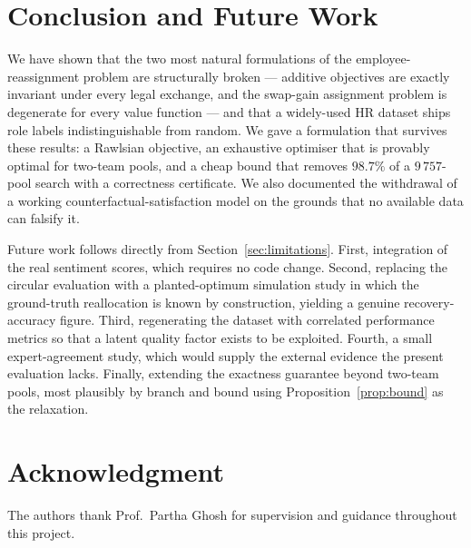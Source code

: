 \documentclass[conference]{IEEEtran}
\begin{document}
\section{Conclusion and Future Work}\label{sec:conclusion}

We have shown that the two most natural formulations of the employee-reassignment
problem are structurally broken --- additive objectives are exactly invariant
under every legal exchange, and the swap-gain assignment problem is degenerate for
every value function --- and that a widely-used HR dataset ships role labels
indistinguishable from random. We gave a formulation that survives these results:
a Rawlsian objective, an exhaustive optimiser that is provably optimal for
two-team pools, and a cheap bound that removes $98.7\%$ of a $9\,757$-pool search
with a correctness certificate. We also documented the withdrawal of a working
counterfactual-satisfaction model on the grounds that no available data can
falsify it.

Future work follows directly from Section~\ref{sec:limitations}. First,
integration of the real sentiment scores, which requires no code change.
Second, replacing the circular evaluation with a planted-optimum simulation
study in which the ground-truth reallocation is known by construction, yielding a
genuine recovery-accuracy figure. Third, regenerating the dataset with correlated
performance metrics so that a latent quality factor exists to be exploited.
Fourth, a small expert-agreement study, which would supply the external evidence
the present evaluation lacks. Finally, extending the exactness guarantee beyond
two-team pools, most plausibly by branch and bound using
Proposition~\ref{prop:bound} as the relaxation.

\section*{Acknowledgment}
The authors thank Prof.\ Partha Ghosh for supervision and guidance throughout
this project.
\end{document}
